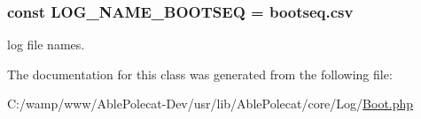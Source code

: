 \subsubsection[{L\+O\+G\+\_\+\+N\+A\+M\+E\+\_\+\+B\+O\+O\+T\+S\+E\+Q}]{\setlength{\rightskip}{0pt plus 5cm}const L\+O\+G\+\_\+\+N\+A\+M\+E\+\_\+\+B\+O\+O\+T\+S\+E\+Q = \textquotesingle{}bootseq.\+csv\textquotesingle{}}\label{class_able_polecat___log___boot_a645cd359836227fd9f770339a3147e7b}
log file names. 

The documentation for this class was generated from the following file\+:\begin{DoxyCompactItemize}
\item 
C\+:/wamp/www/\+Able\+Polecat-\/\+Dev/usr/lib/\+Able\+Polecat/core/\+Log/\hyperlink{_boot_8php}{Boot.\+php}\end{DoxyCompactItemize}
